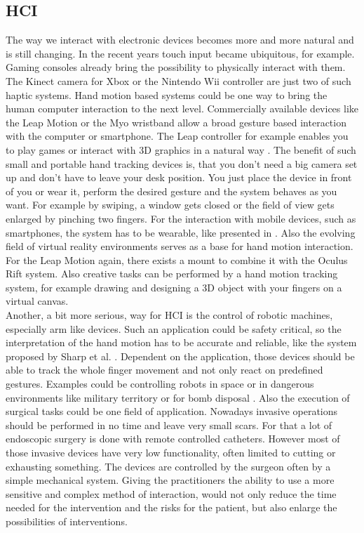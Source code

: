 \subsection{\ac{HCI}} \label{subsec:applications:HCI}
The way we interact with electronic devices becomes more and more natural and is still changing. In the recent years touch input became ubiquitous, for example. Gaming consoles already bring the possibility to physically interact with them. The Kinect camera for Xbox or the Nintendo Wii controller are just two of such haptic systems. Hand motion based systems could be one way to bring the human computer interaction to the next level. Commercially available devices like the Leap Motion or the Myo wristband allow a broad gesture based interaction with the computer or smartphone. The Leap controller for example enables you to play games or interact with 3D graphics in a natural way \cite{leap}. The benefit of such small and portable hand tracking devices is, that you don't need a big camera set up and don't have to leave your desk position. You just place the device in front of you or wear it, perform the desired gesture and the system behaves as you want. For example by swiping, a window gets closed or the field of view gets enlarged by pinching two fingers. For the interaction with mobile devices, such as smartphones, the system has to be wearable, like presented in \cite{Digits}. Also the evolving field of virtual reality environments serves as a base for hand motion interaction. For the Leap Motion again, there exists a mount to combine it with the Oculus Rift system. Also creative tasks can be performed by a hand motion tracking system, for example drawing and designing a 3D object with your fingers on a virtual canvas.\\
Another, a bit more serious, way for \ac{HCI} is the control of robotic machines, especially arm like devices. Such an application could be safety critical, so the interpretation of the hand motion has to be accurate and reliable, like the system proposed by Sharp et al. \cite{sharp2015accurate}. Dependent on the application, those devices should be able to track the whole finger movement and not only react on predefined gestures. Examples could be controlling robots in space \cite{dipietro2008survey} or in dangerous environments like military territory or for bomb disposal \cite{greenleaf1996developing}. Also the execution of surgical tasks could be one field of application. Nowadays invasive operations should be performed in no time and leave very small scars. For that a lot of endoscopic surgery is done with remote controlled catheters. However most of those invasive devices have very low functionality, often limited to cutting or exhausting something. The devices are controlled by the surgeon often by a simple mechanical system. Giving the practitioners the ability to use a more sensitive and complex method of interaction, would not only reduce the time needed for the intervention and the risks for the patient, but also enlarge the possibilities of interventions.


